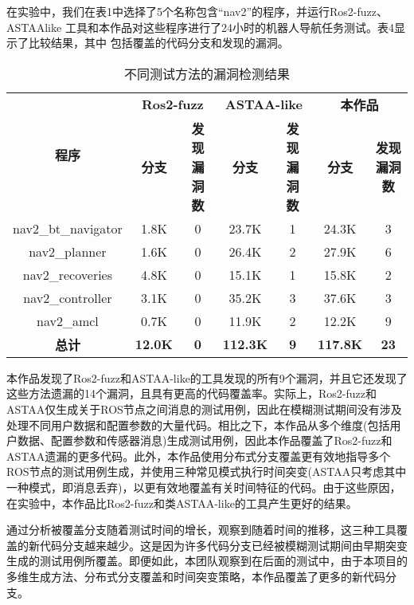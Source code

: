 在实验中，我们在表1中选择了5个名称包含``nav2''的程序，并运行Ros2-fuzz、ASTAAlike
工具和本作品对这些程序进行了24小时的机器人导航任务测试。表4显示了比较结果，其中
包括覆盖的代码分支和发现的漏洞。
\begin{table}[H]
	\small
	\caption{不同测试方法的漏洞检测结果}
	\centering
	\begin{tabular}{ccccccc}
		\hline
		\multirow{2}{*}{\textbf{程序}} & \multicolumn{2}{c}{\textbf{Ros2-fuzz}} & \multicolumn{2}{c}{\textbf{ASTAA-like}} & \multicolumn{2}{c}{\textbf{本作品}} \\
		\cline{2-7}
		& \textbf{分支} & \textbf{发现漏洞数} & \textbf{分支} & \textbf{发现漏洞数} & \textbf{分支} & \textbf{发现漏洞数} \\
		\hline
		nav2\_bt\_navigator & 1.8K & 0 & 23.7K & 1 & 24.3K & 3 \\
		nav2\_planner & 1.6K & 0 & 26.4K & 2 & 27.9K & 6 \\
		nav2\_recoveries & 4.8K & 0 & 15.1K & 1 & 15.8K & 2 \\
		nav2\_controller & 3.1K & 0 & 35.2K & 3 & 37.6K & 3 \\
		nav2\_amcl & 0.7K & 0 & 11.9K & 2 & 12.2K & 9 \\
		\textbf{总计} & \textbf{12.0K} & \textbf{0} & \textbf{112.3K} & \textbf{9} & \textbf{117.8K} & \textbf{23} \\
		\hline
	\end{tabular}
\end{table}
本作品发现了Ros2-fuzz和ASTAA-like的工具发现的所有9个漏洞，并且它还发现了这些方法遗漏的14个漏洞，且具有更高的代码覆盖率。实际上，Ros2-fuzz和ASTAA仅生成关于ROS节点之间消息的测试用例，因此在模糊测试期间没有涉及处理不同用户数据和配置参数的大量代码。相比之下，本作品从多个维度(包括用户数据、配置参数和传感器消息)生成测试用例，因此本作品覆盖了Ros2-fuzz和ASTAA遗漏的更多代码。此外，本作品使用分布式分支覆盖更有效地指导多个ROS节点的测试用例生成，并使用三种常见模式执行时间突变(ASTAA只考虑其中一种模式，即消息丢弃)，以更有效地覆盖有关时间特征的代码。由于这些原因，在实验中，本作品比Ros2-fuzz和类ASTAA-like的工具产生更好的结果。

通过分析被覆盖分支随着测试时间的增长，观察到随着时间的推移，这三种工具覆盖的新代码分支越来越少。这是因为许多代码分支已经被模糊测试期间由早期突变生成的测试用例所覆盖。即便如此，本团队观察到在后面的测试中，由于本项目的多维生成方法、分布式分支覆盖和时间突变策略，本作品覆盖了更多的新代码分支。
